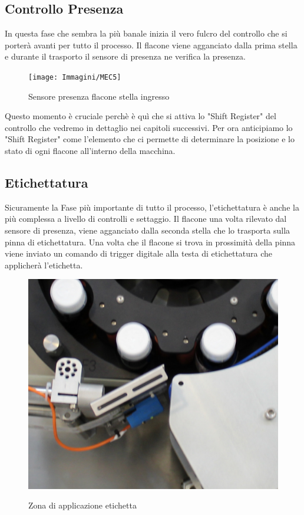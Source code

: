 \documentclass[12pt, a4paper, oneside]{book}
\begin{document}
\subsection{Controllo Presenza}
In questa fase che sembra la più banale inizia il vero fulcro del controllo che si porterà avanti per tutto il processo. Il flacone viene agganciato dalla prima stella e durante il trasporto il sensore di presenza ne verifica la presenza. 

\begin{figure}[H]
	\centering
	\texttt{[image: Immagini/MEC5]}
	\label{mec5}
	\caption{ Sensore presenza flacone stella ingresso}
\end{figure}

Questo momento è cruciale perchè è quì che si attiva lo "Shift Register" del controllo che vedremo in dettaglio nei capitoli successivi. Per ora anticipiamo lo "Shift Register" come l'elemento che ci permette di determinare la posizione e lo stato di ogni flacone all'interno della macchina.




\subsection{Etichettatura}
Sicuramente la Fase più importante di tutto il processo, l'etichettatura è anche la più complessa a livello di controlli e settaggio. Il flacone una volta rilevato dal sensore di presenza, viene agganciato dalla seconda stella che lo trasporta sulla pinna di etichettatura. Una volta che il flacone si trova in prossimità della pinna viene inviato un comando di trigger digitale alla testa di etichettatura che applicherà l'etichetta. 

\begin{figure}[H]
	\centering
	\includegraphics[width=12cm]{Immagini/MEC6}
	\label{mec6}
	\caption{ Zona di applicazione etichetta }
\end{figure}
\end{document}
